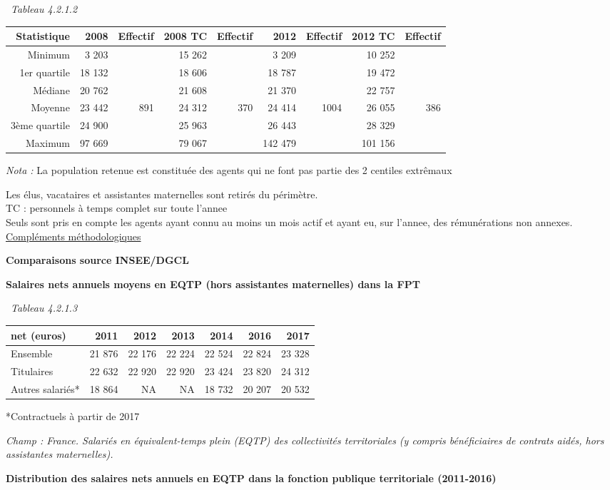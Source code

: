 ~\emph{Tableau 4.2.1.2}

\begin{longtable}[]{@{}rrrrrrrrr@{}}
\toprule
Statistique & 2008 & Effectif & 2008 TC & Effectif & 2012 & Effectif &
2012 TC & Effectif\tabularnewline
\midrule
\endhead
Minimum & 3 203 & & 15 262 & & 3 209 & & 10 252 &\tabularnewline
1er quartile & 18 132 & & 18 606 & & 18 787 & & 19 472 &\tabularnewline
Médiane & 20 762 & & 21 608 & & 21 370 & & 22 757 &\tabularnewline
Moyenne & 23 442 & 891 & 24 312 & 370 & 24 414 & 1004 & 26 055 &
386\tabularnewline
3ème quartile & 24 900 & & 25 963 & & 26 443 & & 28 329 &\tabularnewline
Maximum & 97 669 & & 79 067 & & 142 479 & & 101 156 &\tabularnewline
\bottomrule
\end{longtable}

\emph{Nota :} La population retenue est constituée des agents qui ne
font pas partie des 2 centiles extrêmaux

Les élus, vacataires et assistantes maternelles sont retirés du
périmètre.\\
TC : personnels à temps complet sur toute l'annee\\
Seuls sont pris en compte les agents ayant connu au moins un mois actif
et ayant eu, sur l'annee, des rémunérations non annexes.\\
\href{../Docs/méthodologie.pdf}{Compléments méthodologiques}

\textbf{Comparaisons source INSEE/DGCL}

\textbf{Salaires nets annuels moyens en EQTP (hors assistantes
maternelles) dans la FPT}

~\emph{Tableau 4.2.1.3}

\begin{longtable}[]{@{}lrrrrrr@{}}
\toprule
net (euros) & 2011 & 2012 & 2013 & 2014 & 2016 & 2017\tabularnewline
\midrule
\endhead
Ensemble & 21 876 & 22 176 & 22 224 & 22 524 & 22 824 & 23
328\tabularnewline
Titulaires & 22 632 & 22 920 & 22 920 & 23 424 & 23 820 & 24
312\tabularnewline
Autres salariés* & 18 864 & NA & NA & 18 732 & 20 207 & 20
532\tabularnewline
\bottomrule
\end{longtable}

*Contractuels à partir de 2017

\emph{Champ : France. Salariés en équivalent-temps plein (EQTP) des
collectivités territoriales (y compris bénéficiaires de contrats aidés,
hors assistantes maternelles).}

\textbf{Distribution des salaires nets annuels en EQTP dans la fonction
publique territoriale (2011-2016)}

